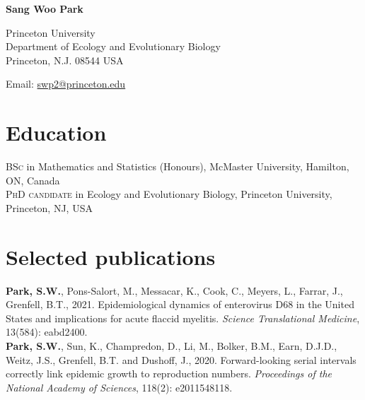 \documentclass[11pt]{article} %
\begin{document}

{\LARGE\bfseries Sang Woo Park} %
\bigskip\bigskip\medskip %

Princeton University\\ %
Department of Ecology and Evolutionary Biology\\
Princeton, N.J. 08544 USA
\medskip %

Email: \href{mailto:swp2@princeton.edu}{swp2@princeton.edu}\\ %


\section*{Education}

\textsc{BSc} in Mathematics and Statistics (Honours), McMaster University, Hamilton, ON, Canada\\
\textsc{PhD candidate} in Ecology and Evolutionary Biology, Princeton University, Princeton, NJ, USA\\


\section*{Selected publications}

 \textbf{Park, S.W.}, Pons-Salort, M., Messacar, K., Cook, C., Meyers, L., Farrar, J., Grenfell, B.T., 2021. Epidemiological dynamics of enterovirus D68 in the United States and implications for acute flaccid myelitis. \textit{Science Translational Medicine}, 13(584): eabd2400.\\

 \textbf{Park, S.W.}, Sun, K., Champredon, D., Li, M., Bolker, B.M., Earn, D.J.D., Weitz, J.S., Grenfell, B.T. and Dushoff, J., 2020. Forward-looking serial intervals correctly link epidemic growth to reproduction numbers. \textit{Proceedings of the National Academy of Sciences}, 118(2): e2011548118.\\
\end{document}
